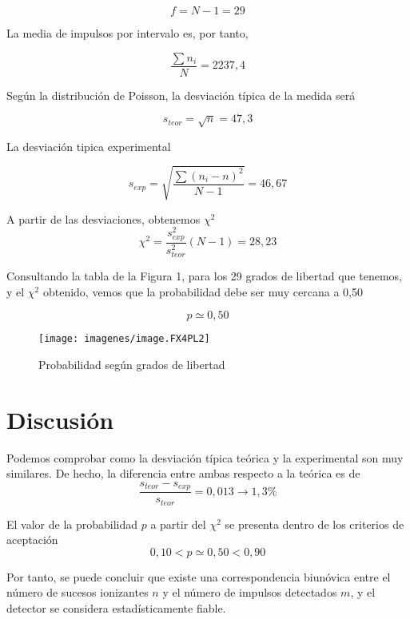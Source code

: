 \documentclass[a4paper,12pt,spanish]{article}
\begin{document}
	\[f = N - 1 = 29 		\]
	
	La media de impulsos por intervalo es, por tanto, 
	
	\[ \frac{\sum n_i}{N} = 2237,4	\]
	
	Según la distribución de Poisson, la desviación típica de la medida será
	
	\[ s_{teor} = \sqrt{n} = 47,3		\]
	
	La desviación tipica experimental
	
	\[s_{exp} = \sqrt{\frac{\sum (n_i - n)^2}{N - 1}} = 46,67			\]
	
	
	A partir de las desviaciones, obtenemos $\chi^2$	
	\[\chi^2 = \frac{s^2_{exp}}{s^2_{teor}}(N-1) = 28,23			\]
	
	
	Consultando la tabla de la Figura 1, para los 29 grados de libertad que tenemos, y el $\chi^2$ obtenido, vemos que la probabilidad debe ser muy cercana a 0,50
	
	
	
	\[p \simeq 0,50 					\]
	
	
	
	
	
	
\begin{figure}[H]
	\centering
	\texttt{[image: imagenes/image.FX4PL2]}
	\caption{Probabilidad según grados de libertad}
	\label{fig:chicuadrado}
\end{figure}
	
	
	\section{Discusión}
	
	Podemos comprobar como la desviación típica teórica y la experimental son muy similares. De hecho, la diferencia entre ambas respecto a la teórica es de 
	\[ \frac{s_{teor}- s_{exp} }{ s_{teor} } = 0,013 \longrightarrow 1,3\%
	\]
	
	El valor de la probabilidad $p$ a partir del $\chi ^2$ se presenta dentro de los criterios de aceptación
	\[ 0,10 < p \simeq 0,50 < 0,90
	\]

	Por tanto, se puede concluir que existe una correspondencia biunóvica entre el número de sucesos ionizantes $n$ y el número de impulsos detectados $m$, y 
	el detector se considera estadísticamente fiable.
	
	
	
	

	
	
	
	
\end{document}
